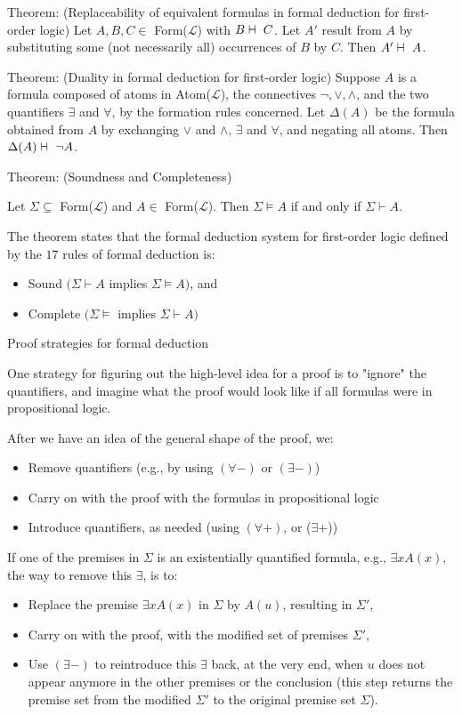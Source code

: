\documentclass{article}
\newcommand{\vdashv}{%
    \mathrel{%
        \text{%
            \ooalign{$\vdash$ \cr $\dashv$ \cr}%
        }
    }
}
\begin{document}
Theorem: (Replaceability of equivalent formulas in formal deduction for first-order logic) Let $A,B,C \in$ Form($\mathcal{L}$) with $B \vdashv C$. Let $A'$ result from $A$ by substituting some (not necessarily all) occurrences of $B$ by $C$. Then $A' \vdashv A$.

Theorem: (Duality in formal deduction for first-order logic) Suppose $A$ is a formula composed of atoms in Atom($\mathcal{L}$), the connectives $\neg, \vee, \wedge$, and the two quantifiers $\exists$ and $\forall$, by the formation rules concerned. Let $\Delta(A)$ be the formula obtained from $A$ by exchanging $\vee$ and $\wedge$, $\exists$ and $\forall$, and negating all atoms. Then $\Delta(A) \vdashv \neg A$.

Theorem: (Soundness and Completeness)

Let $\Sigma \subseteq$ Form($\mathcal{L}$) and $A \in $ Form($\mathcal{L}$). Then $\Sigma \vDash A$ if and only if $\Sigma \vdash A$.

The theorem states that the formal deduction system for first-order logic defined by the $17$ rules of formal deduction is:
\begin{itemize}
    \item Sound $(\Sigma \vdash A$ implies $\Sigma \vDash A)$, and 
    \item Complete $(\Sigma \vDash$ implies $\Sigma \vdash A)$
\end{itemize}

Proof strategies for formal deduction

One strategy for figuring out the high-level idea for a proof is to "ignore" the quantifiers, and imagine what the proof would look like if all formulas were in propositional logic.

After we have an idea of the general shape of the proof, we:
\begin{itemize}
    \item Remove quantifiers (e.g., by using $(\forall -)$ or $(\exists -)$)
    \item Carry on with the proof with the formulas in propositional logic
    \item Introduce quantifiers, as needed (using $(\forall +)$, or ($\exists +$))
\end{itemize}

If one of the premises in $\Sigma$ is an existentially quantified formula, e.g., $\exists x A(x)$, the way to remove this $\exists$, is to:
\begin{itemize}
    \item Replace the premise $\exists x A(x)$ in $\Sigma$ by $A(u)$, resulting in $\Sigma'$, 
    \item Carry on with the proof, with the modified set of premises $\Sigma'$,
    \item Use $(\exists -)$ to reintroduce this $\exists$ back, at the very end, when $u$ does not appear anymore in the other premises or the conclusion (this step returns the premise set from the modified $\Sigma'$ to the original premise set $\Sigma$).
\end{itemize}
\end{document}
